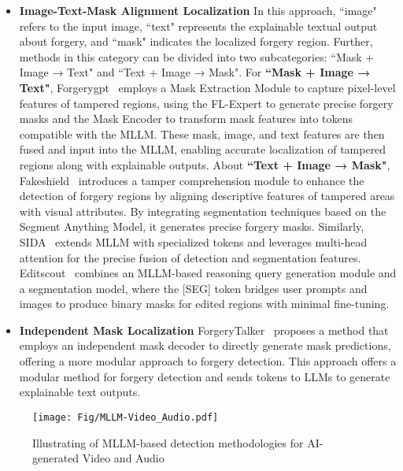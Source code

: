 \begin{itemize}
\item \textbf{Image-Text-Mask Alignment Localization}
In this approach, ``image" refers to the input image, ``text" represents the explainable textual output about forgery, and ``mask" indicates the localized forgery region. Further, methods in this category can be divided into two subcategories: ``Mask + Image → Text" and ``Text + Image → Mask". For \textbf{``Mask + Image → Text"}, Forgerygpt~\cite{li2024forgerygpt} employs a Mask Extraction Module to capture pixel-level features of tampered regions, using the FL-Expert to generate precise forgery masks and the Mask Encoder to transform mask features into tokens compatible with the MLLM. These mask, image, and text features are then fused and input into the MLLM, enabling accurate localization of tampered regions along with explainable outputs. 
About \textbf{``Text + Image → Mask"}, Fakeshield~\cite{xu2024fakeshield} introduces a tamper comprehension module to enhance the detection of forgery regions by aligning descriptive features of tampered areas with visual attributes. By integrating segmentation techniques based on the Segment Anything Model, it generates precise forgery masks. Similarly, SIDA~\cite{huang2024sida} extends MLLM with specialized tokens and leverages multi-head attention for the precise fusion of detection and segmentation features. Editscout~\cite{nguyen2024editscout} combines an MLLM-based reasoning query generation module and a segmentation model, where the [SEG] token bridges user prompts and images to produce binary masks for edited regions with minimal fine-tuning.

\item \textbf{Independent Mask Localization}
ForgeryTalker~\cite{lian2024large} proposes a method that employs an independent mask decoder to directly generate mask predictions, offering a more modular approach to forgery detection. This approach offers a modular method for forgery detection and sends tokens to LLMs to generate explainable text outputs.
\end{itemize}

\begin{figure*}[!ht]
  \centering
    \texttt{[image: Fig/MLLM-Video\_Audio.pdf]}
    \caption{Illustrating of MLLM-based detection methodologies for AI-generated Video and Audio}
    \label{fig:MLLM-Video&Audio}
\end{figure*}

